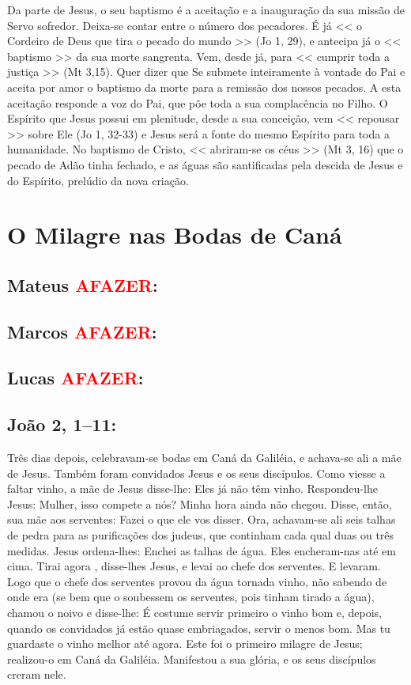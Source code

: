 \documentclass[10pt,a5paper]{book}
\newcommand{\from}[1]{\subsection*{#1}}
\newcommand{\TODO}{\textcolor{red}{\ttfamily AFAZER}}
\begin{document}
Da parte de Jesus, o seu baptismo é a aceitação e a inauguração da sua missão de Servo sofredor.
Deixa-se contar entre o número dos pecadores.
É já << o Cordeiro de Deus que tira o pecado do mundo >> (Jo 1, 29), e antecipa já o << baptismo >> da sua morte sangrenta.
Vem, desde já, para << cumprir toda a justiça >> (Mt 3,15).
Quer dizer que Se submete inteiramente à vontade do Pai e aceita por amor o baptismo da morte para a remissão dos nossos pecados.
A esta aceitação responde a voz do Pai, que põe toda a sua complacência no Filho.
O Espírito que Jesus possui em plenitude, desde a sua conceição, vem << repousar >> sobre Ele (Jo 1, 32-33) e Jesus será a fonte do mesmo Espírito para toda a humanidade.
No baptismo de Cristo, << abriram-se os céus >> (Mt 3, 16) que o pecado de Adão tinha fechado, e as águas são santificadas pela descida de Jesus e do Espírito, prelúdio da nova criação.


\section{O Milagre nas Bodas de Caná}

\from{Mateus \TODO:}

\from{Marcos \TODO:}

\from{Lucas \TODO:}

\from{João 2, 1--11:}

Três dias depois, celebravam-se bodas em Caná da Galiléia, e achava-se ali a mãe de Jesus.
Também foram convidados Jesus e os seus discípulos.
Como viesse a faltar vinho, a mãe de Jesus disse-lhe:
Eles já não têm vinho.
Respondeu-lhe Jesus:
Mulher, isso compete a nós? Minha hora ainda não chegou.
Disse, então, sua mãe aos serventes:
Fazei o que ele vos disser.
Ora, achavam-se ali seis talhas de pedra para as purificações dos judeus, que continham cada qual duas ou três medidas.
Jesus ordena-lhes:
Enchei as talhas de água.
Eles encheram-nas até em cima.
Tirai agora , disse-lhes Jesus, e levai ao chefe dos serventes.
E levaram.
Logo que o chefe dos serventes provou da água tornada vinho, não sabendo de onde era (se bem que o soubessem os serventes, pois tinham tirado a água), chamou o noivo
e disse-lhe:
É costume servir primeiro o vinho bom e, depois, quando os convidados já estão quase embriagados, servir o menos bom.
Mas tu guardaste o vinho melhor até agora.
Este foi o primeiro milagre de Jesus;
realizou-o em Caná da Galiléia.
Manifestou a sua glória, e os seus discípulos creram nele.
\end{document}
